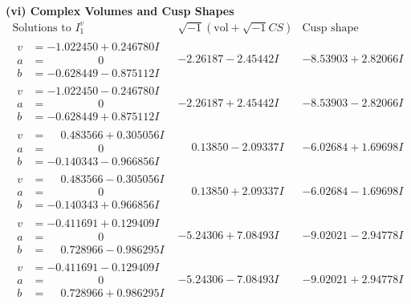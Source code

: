 \documentclass[1p]{elsarticle_modified}
\theoremstyle{definition}
\newcommand{\I}{\sqrt{-1}}
\begin{document}
\newpage\flushleft \textbf{(vi) Complex Volumes and Cusp Shapes}
$$\begin{array}{c|c|c}  
\text{Solutions to }I^v_{1}& \I (\text{vol} + \sqrt{-1}CS) & \text{Cusp shape}\\
 \hline 
\begin{aligned}
v &= -1.022450 + 0.246780 I \\
a &= \phantom{-0.000000 } 0 \\
b &= -0.628449 - 0.875112 I\end{aligned}
 & -2.26187 - 2.45442 I & -8.53903 + 2.82066 I \\ \hline\begin{aligned}
v &= -1.022450 - 0.246780 I \\
a &= \phantom{-0.000000 } 0 \\
b &= -0.628449 + 0.875112 I\end{aligned}
 & -2.26187 + 2.45442 I & -8.53903 - 2.82066 I \\ \hline\begin{aligned}
v &= \phantom{-}0.483566 + 0.305056 I \\
a &= \phantom{-0.000000 } 0 \\
b &= -0.140343 - 0.966856 I\end{aligned}
 & \phantom{-}0.13850 - 2.09337 I & -6.02684 + 1.69698 I \\ \hline\begin{aligned}
v &= \phantom{-}0.483566 - 0.305056 I \\
a &= \phantom{-0.000000 } 0 \\
b &= -0.140343 + 0.966856 I\end{aligned}
 & \phantom{-}0.13850 + 2.09337 I & -6.02684 - 1.69698 I \\ \hline\begin{aligned}
v &= -0.411691 + 0.129409 I \\
a &= \phantom{-0.000000 } 0 \\
b &= \phantom{-}0.728966 - 0.986295 I\end{aligned}
 & -5.24306 + 7.08493 I & -9.02021 - 2.94778 I \\ \hline\begin{aligned}
v &= -0.411691 - 0.129409 I \\
a &= \phantom{-0.000000 } 0 \\
b &= \phantom{-}0.728966 + 0.986295 I\end{aligned}
 & -5.24306 - 7.08493 I & -9.02021 + 2.94778 I \\ \hline\begin{aligned}

\end{aligned}
\end{array}$$
\end{document}
